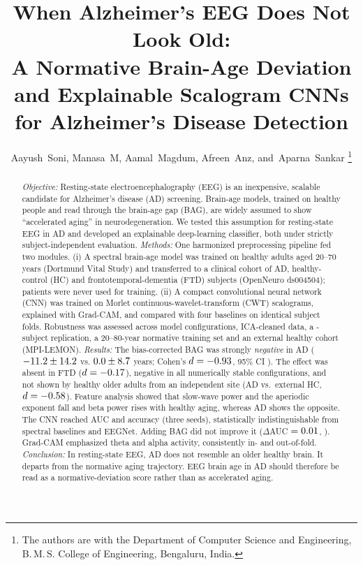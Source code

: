 \documentclass[journal]{IEEEtran}
\begin{document}
\title{When Alzheimer's EEG Does Not Look Old:\\ A Normative Brain-Age Deviation and Explainable Scalogram CNNs for Alzheimer's Disease Detection}

\author{Aayush~Soni, Manasa~M, Aamal~Magdum, Afreen~Anz, and~Aparna~Sankar%
\thanks{The authors are with the Department of Computer Science and Engineering, B.\,M.\,S. College of Engineering, Bengaluru, India.}}


\maketitle

\begin{abstract}
\emph{Objective:} Resting-state electroencephalography (EEG) is an inexpensive, scalable candidate for Alzheimer's disease (AD) screening. Brain-age models, trained on healthy people and read through the brain-age gap (BAG), are widely assumed to show ``accelerated aging'' in neurodegeneration. We tested this assumption for resting-state EEG in AD and developed an explainable deep-learning classifier, both under strictly subject-independent evaluation.
\emph{Methods:} One harmonized preprocessing pipeline fed two modules. (i) A spectral brain-age model was trained on \dmN{} healthy adults aged 20--70 years (Dortmund Vital Study) and transferred to a clinical cohort of \nAD{} AD, \nHC{} healthy-control (HC) and \nFTD{} frontotemporal-dementia (FTD) subjects (OpenNeuro ds004504); patients were never used for training. (ii) A compact convolutional neural network (CNN) was trained on Morlet continuous-wavelet-transform (CWT) scalograms, explained with Grad-CAM, and compared with four baselines on identical subject folds. Robustness was assessed across \nConfigs{} model configurations, ICA-cleaned data, a \repNok{}-subject replication, a 20--80-year normative training set and an external healthy cohort (MPI-LEMON).
\emph{Results:} The bias-corrected BAG was strongly \emph{negative} in AD ($-11.2{}\pm14.2{}$ vs. $0.0{}\pm8.7{}$ years; Cohen's $d=-0.93{}$, 95\% CI \bagDci{}). The effect was absent in FTD ($d=-0.17{}$), negative in all \nStable{} numerically stable configurations, and not shown by healthy older adults from an independent site (AD vs.\ external HC, $d=-0.58{}$). Feature analysis showed that slow-wave power and the aperiodic exponent fall and beta power rises with healthy aging, whereas AD shows the opposite. The CNN reached AUC \cnnAUC{} and accuracy \cnnAcc{} (three seeds), statistically indistinguishable from spectral baselines and EEGNet. Adding BAG did not improve it ($\Delta$AUC $=0.01{}$, \combP{}). Grad-CAM emphasized theta and alpha activity, consistently in- and out-of-fold.
\emph{Conclusion:} In resting-state EEG, AD does not resemble an older healthy brain. It departs from the normative aging trajectory. EEG brain age in AD should therefore be read as a normative-deviation score rather than as accelerated aging.
\end{abstract}
\end{document}
